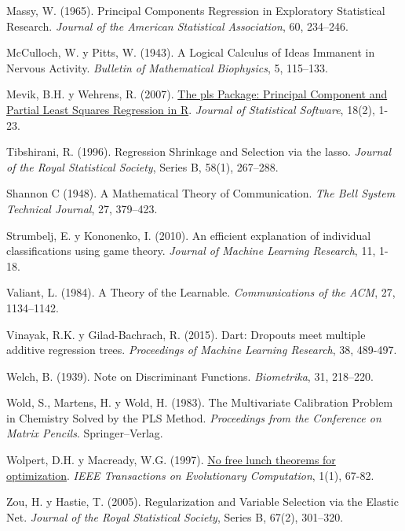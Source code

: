 \documentclass[
]{book}
\theoremstyle{break}
\theoremstyle{definition}
\theoremstyle{definition}
\theoremstyle{definition}
\theoremstyle{remark}
\begin{document}
Massy, W. (1965). Principal Components Regression in Exploratory Statistical Research. \emph{Journal of the American Statistical Association}, 60, 234--246.

McCulloch, W. y Pitts, W. (1943). A Logical Calculus of Ideas Immanent in Nervous Activity. \emph{Bulletin of Mathematical Biophysics}, 5, 115--133.

Mevik, B.H. y Wehrens, R. (2007). \href{https://www.jstatsoft.org/article/view/v018i02}{The pls Package: Principal Component and Partial Least Squares Regression in R}. \emph{Journal of Statistical Software}, 18(2), 1-23.

Tibshirani, R. (1996). Regression Shrinkage and Selection via the lasso. \emph{Journal of the Royal Statistical Society}, Series B, 58(1), 267--288.

Shannon C (1948). A Mathematical Theory of Communication. \emph{The Bell System Technical Journal}, 27, 379--423.

Strumbelj, E. y Kononenko, I. (2010). An efficient explanation of individual classifications using game theory. \emph{Journal of Machine Learning Research}, 11, 1-18.

Valiant, L. (1984). A Theory of the Learnable. \emph{Communications of the ACM}, 27, 1134--1142.

Vinayak, R.K. y Gilad-Bachrach, R. (2015). Dart: Dropouts meet multiple additive regression trees. \emph{Proceedings of Machine Learning Research}, 38, 489-497.

Welch, B. (1939). Note on Discriminant Functions. \emph{Biometrika}, 31, 218--220.

Wold, S., Martens, H. y Wold, H. (1983). The Multivariate Calibration Problem in Chemistry Solved by the PLS Method. \emph{Proceedings from the Conference on Matrix Pencils}. Springer--Verlag.

Wolpert, D.H. y Macready, W.G. (1997). \href{https://ieeexplore.ieee.org/abstract/document/585893?casa_token=IHZIcIuLxFEAAAAA:yKn2cFuhdh2S6Liw1otdqZAhCcVyFFwwk9LxwMEn_deuWO5i2n1uAOvTYdeFbh6cEJuXTPdkDQ}{No free lunch theorems for optimization}. \emph{IEEE Transactions on Evolutionary Computation}, 1(1), 67-82.

Zou, H. y Hastie, T. (2005). Regularization and Variable Selection via the Elastic Net. \emph{Journal of the Royal Statistical Society}, Series B, 67(2), 301--320.

  
\end{document}
